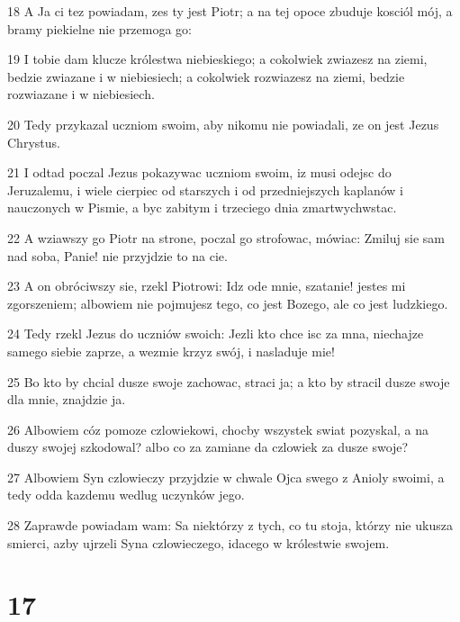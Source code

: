 \par 18 A Ja ci tez powiadam, zes ty jest Piotr; a na tej opoce zbuduje kosciól mój, a bramy piekielne nie przemoga go:
\par 19 I tobie dam klucze królestwa niebieskiego; a cokolwiek zwiazesz na ziemi, bedzie zwiazane i w niebiesiech; a cokolwiek rozwiazesz na ziemi, bedzie rozwiazane i w niebiesiech.
\par 20 Tedy przykazal uczniom swoim, aby nikomu nie powiadali, ze on jest Jezus Chrystus.
\par 21 I odtad poczal Jezus pokazywac uczniom swoim, iz musi odejsc do Jeruzalemu, i wiele cierpiec od starszych i od przedniejszych kaplanów i nauczonych w Pismie, a byc zabitym i trzeciego dnia zmartwychwstac.
\par 22 A wziawszy go Piotr na strone, poczal go strofowac, mówiac: Zmiluj sie sam nad soba, Panie! nie przyjdzie to na cie.
\par 23 A on obróciwszy sie, rzekl Piotrowi: Idz ode mnie, szatanie! jestes mi zgorszeniem; albowiem nie pojmujesz tego, co jest Bozego, ale co jest ludzkiego.
\par 24 Tedy rzekl Jezus do uczniów swoich: Jezli kto chce isc za mna, niechajze samego siebie zaprze, a wezmie krzyz swój, i nasladuje mie!
\par 25 Bo kto by chcial dusze swoje zachowac, straci ja; a kto by stracil dusze swoje dla mnie, znajdzie ja.
\par 26 Albowiem cóz pomoze czlowiekowi, chocby wszystek swiat pozyskal, a na duszy swojej szkodowal? albo co za zamiane da czlowiek za dusze swoje?
\par 27 Albowiem Syn czlowieczy przyjdzie w chwale Ojca swego z Anioly swoimi, a tedy odda kazdemu wedlug uczynków jego.
\par 28 Zaprawde powiadam wam: Sa niektórzy z tych, co tu stoja, którzy nie ukusza smierci, azby ujrzeli Syna czlowieczego, idacego w królestwie swojem.

\chapter{17}

